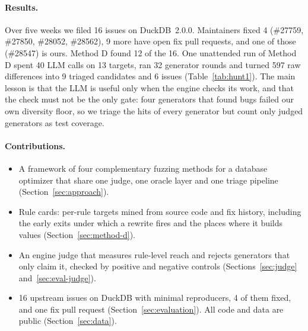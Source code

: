 \paragraph{Results.} Over five weeks we filed 16 issues on DuckDB~2.0.0. Maintainers fixed 4 (\#27759, \#27850,
\#28052, \#28562), 9 more have open fix pull requests, and one of those (\#28547) is ours. Method D found 12 of the 16.
One unattended run of Method D spent 40 LLM calls on 13 targets, ran 32 generator rounds and turned 597 raw differences
into 9 triaged candidates and 6 issues (Table~\ref{tab:hunt1}). The main lesson is that the LLM is useful only when the
engine checks its work, and that the check must not be the only gate: four generators that found bugs failed our own
diversity floor, so we triage the hits of every generator but count only judged generators as test coverage.

\paragraph{Contributions.}
\begin{itemize}
  \item A framework of four complementary fuzzing methods for a database optimizer that share one judge, one oracle
        layer and one triage pipeline (Section~\ref{sec:approach}).
  \item Rule cards: per-rule targets mined from source code and fix history, including the early exits under which a
        rewrite fires and the places where it builds values (Section~\ref{sec:method-d}).
  \item An engine judge that measures rule-level reach and rejects generators that only claim it, checked by positive
        and negative controls (Sections~\ref{sec:judge} and~\ref{sec:eval-judge}).
  \item 16 upstream issues on DuckDB with minimal reproducers, 4 of them fixed, and one fix pull request
        (Section~\ref{sec:evaluation}). All code and data are public (Section~\ref{sec:data}).
\end{itemize}
